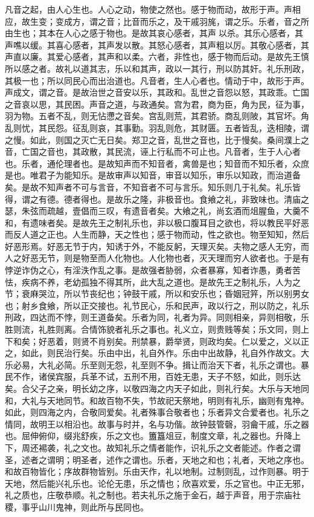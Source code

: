 \documentclass[]{article}
\begin{document}
凡音之起，由人心生也。人心之动，物使之然也。感于物而动，故形于声。声相应，故生变；变成方，谓之音；比音而乐之，及干戚羽旄，谓之乐。乐者，音之所由生也；其本在人心之感于物也。是故其哀心感者，其声以杀。其乐心感者，其声噍以缓。其喜心感者，其声发以散。其怒心感者，其声粗以厉。其敬心感者，其声直以廉。其爱心感者，其声和以柔。六者，非性也，感于物而后动。是故先王慎所以感之者。故礼以道其志，乐以和其声，政以一其行，刑以防其奸。礼乐刑政，其极一也；所以同民心而出治道也。凡音者，生人心者也。情动于中，故形于声。声成文，谓之音。是故治世之音安以乐，其政和。乱世之音怨以怒，其政乖。亡国之音哀以思，其民困。声音之道，与政通矣。宫为君，商为臣，角为民，征为事，羽为物。五者不乱，则无怗懘之音矣。宫乱则荒，其君骄。商乱则陂，其官坏。角乱则忧，其民怨。征乱则哀，其事勤。羽乱则危，其财匮。五者皆乱，迭相陵，谓之慢。如此，则国之灭亡无日矣。郑卫之音，乱世之音也，比于慢矣。桑间濮上之音，亡国之音也，其政散，其民流，诬上行私而不可止也。凡音者，生于人心者也。乐者，通伦理者也。是故知声而不知音者，禽兽是也；知音而不知乐者，众庶是也。唯君子为能知乐。是故审声以知音，审音以知乐，审乐以知政，而治道备矣。是故不知声者不可与言音，不知音者不可与言乐。知乐则几于礼矣。礼乐皆得，谓之有德。德者得也。是故乐之隆，非极音也。食飨之礼，非致味也。清庙之瑟，朱弦而疏越，壹倡而三叹，有遗音者矣。大飨之礼，尚玄酒而俎腥鱼，大羹不和，有遗味者矣。是故先王之制礼乐也，非以极口腹耳目之欲也，将以教民平好恶而反人道之正也。人生而静，天之性也；感于物而动，性之欲也。物至知知，然后好恶形焉。好恶无节于内，知诱于外，不能反躬，天理灭矣。夫物之感人无穷，而人之好恶无节，则是物至而人化物也。人化物也者，灭天理而穷人欲者也。于是有悖逆诈伪之心，有淫泆作乱之事。是故强者胁弱，众者暴寡，知者诈愚，勇者苦怯，疾病不养，老幼孤独不得其所，此大乱之道也。是故先王之制礼乐，人为之节；衰麻哭泣，所以节丧纪也；钟鼓干戚，所以和安乐也；昏姻冠笄，所以别男女也；射乡食飨，所以正交接也。礼节民心，乐和民声，政以行之，刑以防之，礼乐刑政，四达而不悖，则王道备矣。乐者为同，礼者为异。同则相亲，异则相敬，乐胜则流，礼胜则离。合情饰貌者礼乐之事也。礼义立，则贵贱等矣；乐文同，则上下和矣；好恶着，则贤不肖别矣。刑禁暴，爵举贤，则政均矣。仁以爱之，义以正之，如此，则民治行矣。乐由中出，礼自外作。乐由中出故静，礼自外作故文。大乐必易，大礼必简。乐至则无怨，礼至则不争。揖让而治天下者，礼乐之谓也。暴民不作，诸侯宾服，兵革不试，五刑不用，百姓无患，天子不怒，如此，则乐达矣。合父子之亲，明长幼之序，以敬四海之内天子如此，则礼行矣。大乐与天地同和，大礼与天地同节。和故百物不失，节故祀天祭地，明则有礼乐，幽则有鬼神。如此，则四海之内，合敬同爱矣。礼者殊事合敬者也；乐者异文合爱者也。礼乐之情同，故明王以相沿也。故事与时并，名与功偕。故钟鼓管磬，羽龠干戚，乐之器也。屈伸俯仰，缀兆舒疾，乐之文也。簠簋俎豆，制度文章，礼之器也。升降上下，周还裼袭，礼之文也。故知礼乐之情者能作，识礼乐之文者能述。作者之谓圣，述者之谓明；明圣者，述作之谓也。乐者，天地之和也；礼者，天地之序也。和故百物皆化；序故群物皆别。乐由天作，礼以地制。过制则乱，过作则暴。明于天地，然后能兴礼乐也。论伦无患，乐之情也；欣喜欢爱，乐之官也。中正无邪，礼之质也，庄敬恭顺。礼之制也。若夫礼乐之施于金石，越于声音，用于宗庙社稷，事乎山川鬼神，则此所与民同也。
\end{document}
